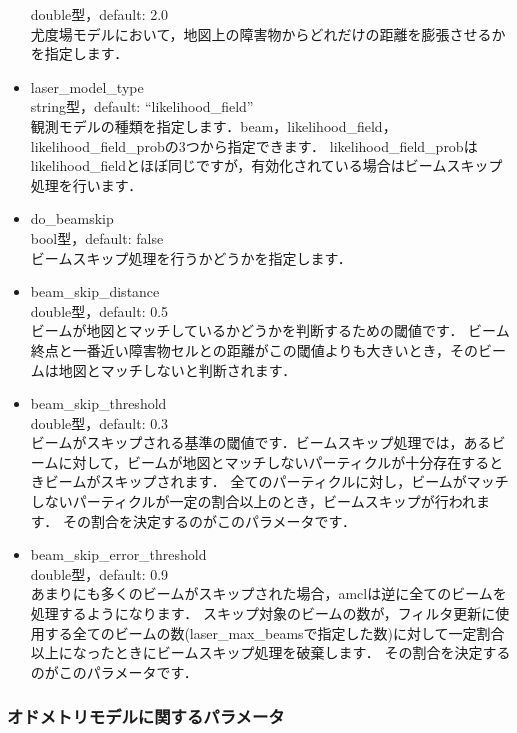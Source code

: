 \documentclass[{../../master}]{subfiles}
\begin{document}
\begin{itemize}
    double型，default: 2.0 \\
    尤度場モデルにおいて，地図上の障害物からどれだけの距離を膨張させるかを指定します．
  \item \textsf{laser\_model\_type} \\
    string型，default: ``likelihood\_field''  \\
    観測モデルの種類を指定します．\textsf{beam}，\textsf{likelihood\_field}，\textsf{likelihood\_field\_prob}の3つから指定できます．
    \textsf{likelihood\_field\_prob}は\textsf{likelihood\_field}とほぼ同じですが，有効化されている場合はビームスキップ処理を行います．
  \item \textsf{do\_beamskip} \\
    bool型，default: false \\
    ビームスキップ処理を行うかどうかを指定します．
  \item \textsf{beam\_skip\_distance} \\
    double型，default: 0.5 \\
    ビームが地図とマッチしているかどうかを判断するための閾値です．
    ビーム終点と一番近い障害物セルとの距離がこの閾値よりも大きいとき，そのビームは地図とマッチしないと判断されます．
  \item \textsf{beam\_skip\_threshold} \\
    double型，default: 0.3 \\
    ビームがスキップされる基準の閾値です．ビームスキップ処理では，あるビームに対して，ビームが地図とマッチしないパーティクルが十分存在するときビームがスキップされます．
    全てのパーティクルに対し，ビームがマッチしないパーティクルが一定の割合以上のとき，ビームスキップが行われます．
    その割合を決定するのがこのパラメータです．
  \item \textsf{beam\_skip\_error\_threshold} \\
    double型，default: 0.9 \\
    あまりにも多くのビームがスキップされた場合，\textsf{amcl}は逆に全てのビームを処理するようになります．
    スキップ対象のビームの数が，フィルタ更新に使用する全てのビームの数(\textsf{laser\_max\_beams}で指定した数)に対して一定割合以上になったときにビームスキップ処理を破棄します．
    その割合を決定するのがこのパラメータです．
\end{itemize}

\subsubsection{オドメトリモデルに関するパラメータ}
\end{document}
